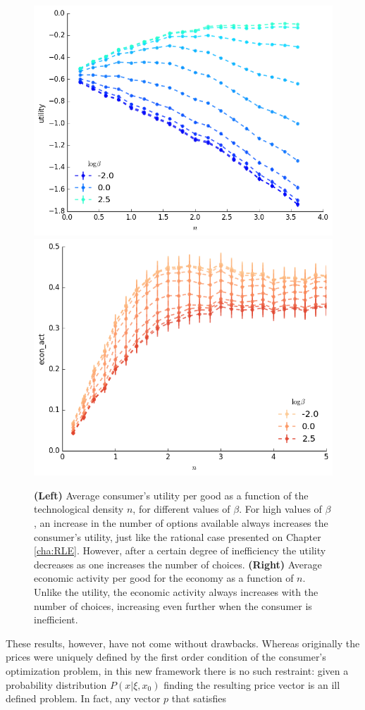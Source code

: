 \begin{figure}[!ht]
  \centering
  \includegraphics[width=.45\textwidth]{figs_inef/utility.png}
  \includegraphics[width=.45\textwidth]{figs_inef/econ_act.png}
  \caption{\textbf{(Left)} Average consumer's utility per good as a function of the technological density $n$, for
    different values of $\beta$. For high values of $\beta$, an increase in the number of options available always increases the consumer's utility, just like the rational case presented on Chapter \ref{cha:RLE}. However, after a certain degree of inefficiency the utility decreases as one increases the number of choices. \textbf{(Right)} Average economic activity per good for the
    economy as a function of $n$. Unlike the utility, the economic activity always increases with the number of choices, increasing even further when the consumer is inefficient.}
  \label{fig:u_and_GDP}
\end{figure}

These results, however, have not come without drawbacks. Whereas originally
the prices were uniquely defined by the first order condition of the
consumer's optimization problem, in this new framework there is no
such restraint: given a probability distribution $P(x | \xi, x_0)$
finding the resulting price vector is an ill defined problem. In
fact, any vector $p$ that satisfies

